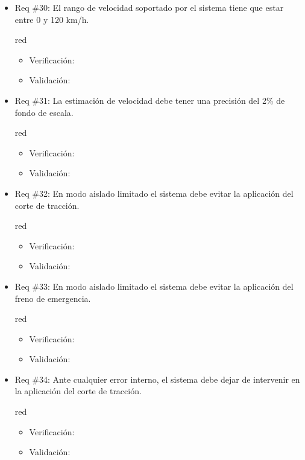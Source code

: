 \documentclass[11pt]{charter}
\begin{document}
\begin{itemize}
\item Req \#30: El rango de velocidad soportado por el sistema tiene que estar entre 0 y 120 km/h.
\begin{consigna}{red}
\begin{itemize}
  \item Verificación:\\
  \item Validación:\\
\end{itemize}
\end{consigna}

\item Req \#31: La estimación de velocidad debe tener una precisión del 2\% de fondo de escala. 
\begin{consigna}{red}
\begin{itemize}
  \item Verificación:\\
  \item Validación:\\
\end{itemize}
\end{consigna}

\item Req \#32: En modo aislado limitado el sistema debe evitar la aplicación del corte de tracción.
\begin{consigna}{red}
\begin{itemize}
  \item Verificación:\\
  \item Validación:\\
\end{itemize}
\end{consigna}

\item Req \#33: En modo aislado limitado el sistema debe evitar la aplicación del freno de emergencia.
\begin{consigna}{red}
\begin{itemize}
  \item Verificación:\\
  \item Validación:\\
\end{itemize}
\end{consigna}

\item Req \#34: Ante cualquier error interno, el sistema debe dejar de intervenir en la aplicación del corte de tracción.
\begin{consigna}{red}
\begin{itemize}
  \item Verificación:\\
  \item Validación:\\
\end{itemize}
\end{consigna}


\end{itemize}
\end{document}

